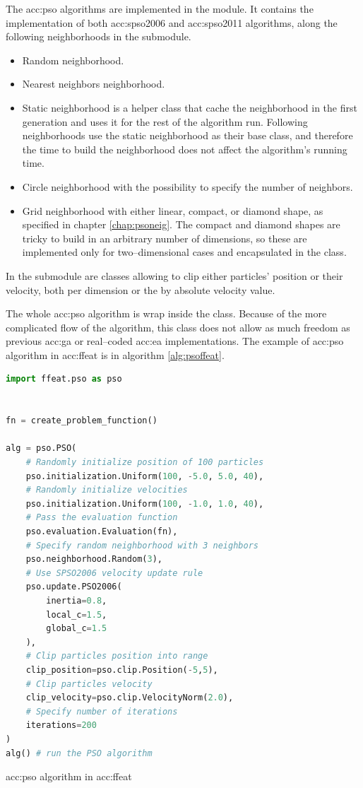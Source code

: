 The \acrlong{acc:pso} algorithms are implemented in the  module. It contains the implementation of both \acrshort{acc:spso2006} and \acrshort{acc:spso2011} algorithms, along the following neighborhoods in the  submodule.
\begin{itemize}
    \item Random neighborhood.
    \item Nearest neighbors neighborhood.
    \item Static neighborhood is a helper class that cache the neighborhood in the first generation and uses it for the rest of the algorithm run. Following neighborhoods use the static neighborhood as their base class, and therefore the time to build the neighborhood does not affect the algorithm's running time.
    \item Circle neighborhood with the possibility to specify the number of neighbors.
    \item Grid neighborhood with either linear, compact, or diamond shape, as specified in chapter \ref{chap:psoneig}. The compact and diamond shapes are tricky to build in an arbitrary number of dimensions, so these are implemented only for two--dimensional cases and encapsulated in the  class.
\end{itemize}

In the  submodule are classes allowing to clip either particles' position or their velocity, both per dimension or the by absolute velocity value.

The whole \acrshort{acc:pso} algorithm is wrap inside the  class. Because of the more complicated flow of the algorithm, this class does not allow as much freedom as previous \acrshort{acc:ga} or real--coded \acrshort{acc:ea} implementations. The example of \acrshort{acc:pso} algorithm in \acrshort{acc:ffeat} is in algorithm \ref{alg:psoffeat}.

\begin{algorithm}[t!]
\begin{lstlisting}[language=Python, xrightmargin=18pt]
import ffeat.pso as pso


fn = create_problem_function()

alg = pso.PSO(
    # Randomly initialize position of 100 particles
    pso.initialization.Uniform(100, -5.0, 5.0, 40),
    # Randomly initialize velocities
    pso.initialization.Uniform(100, -1.0, 1.0, 40),
    # Pass the evaluation function
    pso.evaluation.Evaluation(fn),
    # Specify random neighborhood with 3 neighbors
    pso.neighborhood.Random(3),
    # Use SPSO2006 velocity update rule
    pso.update.PSO2006(
        inertia=0.8, 
        local_c=1.5, 
        global_c=1.5
    ),
    # Clip particles position into range
    clip_position=pso.clip.Position(-5,5),
    # Clip particles velocity
    clip_velocity=pso.clip.VelocityNorm(2.0),
    # Specify number of iterations
    iterations=200
)
alg() # run the PSO algorithm
\end{lstlisting}
\caption{\acrshort*{acc:pso} algorithm in \acrshort*{acc:ffeat}}
\label{alg:psoffeat}
\end{algorithm}
